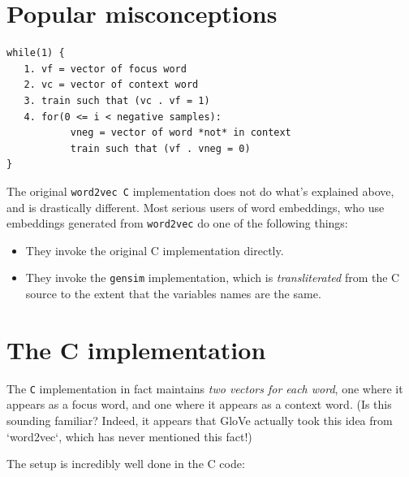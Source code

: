 \documentclass{book}
\newcommand{\wtov}{\texttt{word2vec }}
\begin{document}
\section{Popular misconceptions}
\begin{verbatim}
while(1) {
   1. vf = vector of focus word
   2. vc = vector of context word
   3. train such that (vc . vf = 1)
   4. for(0 <= i < negative samples):
           vneg = vector of word *not* in context
           train such that (vf . vneg = 0)
}
\end{verbatim}

% 

The original \wtov \texttt{C} implementation does not do what's explained above,
and is drastically different. Most serious users of word embeddings, who use
embeddings generated from \texttt{word2vec} do one of the following things:

\begin{itemize}
\item They invoke the original C implementation directly.
\item They invoke the \texttt{gensim} implementation, which is
\emph{transliterated} from the C source to the extent that the variables names
are the same.
\end{itemize}

\section{The C implementation}

The \texttt{C} implementation in fact maintains \emph{two vectors for each word}, one where
it appears as a focus word, and one where it appears as a context word.
(Is this sounding familiar? Indeed, it appears that GloVe actually took this
idea from `word2vec`, which has never mentioned this fact!)

The setup is incredibly well done in the C code:
\end{document}
